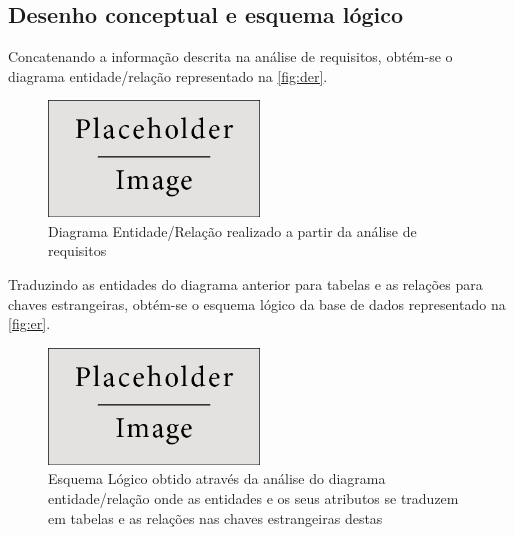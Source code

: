 \documentclass[11pt,twoside,a4paper]{report}
\begin{document}
\subsection{Desenho conceptual e esquema lógico}
Concatenando a informação descrita na análise de requisitos, obtém-se o diagrama entidade/relação representado na \autoref{fig:der}.
\begin{figure}[H]
	\begin{center}
		\includegraphics[width=0.5\textwidth]{placeholder} %
		\caption{Diagrama Entidade/Relação realizado a partir da análise de requisitos}
		\label{fig:der}
	\end{center}
\end{figure}
Traduzindo as entidades do diagrama anterior para tabelas e as relações para chaves estrangeiras, obtém-se o esquema lógico da base de dados representado na \autoref{fig:er}.
\begin{figure}[H]
	\begin{center}
		\includegraphics[width=0.5\textwidth]{placeholder} %
		\caption{Esquema Lógico obtido através da análise do diagrama entidade/relação onde as entidades e os seus atributos se traduzem em tabelas e as relações nas chaves estrangeiras destas}
		\label{fig:er}
	\end{center}
\end{figure}
\end{document}
